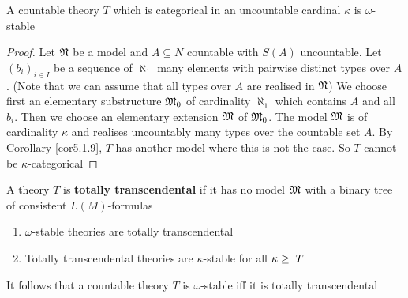 \documentclass[11pt]{article}
\begin{document}
\begin{theorem}[]
\label{thm5.2.4}
A countable theory \(T\) which is categorical in an uncountable cardinal \(\kappa\) is \(\omega\)-stable
\end{theorem}

\begin{proof}
Let \(\mathfrak{N}\) be a model and \(A\subseteq N\) countable with \(S(A)\) uncountable. Let \((b_i)_{i\in I}\) be a
sequence of \(\aleph_1\) many elements with pairwise distinct types over \(A\). (Note that we can
assume that all types over \(A\) are realised in \(\mathfrak{N}\)) We choose first an elementary
substructure \(\mathfrak{M}_0\) of cardinality \(\aleph_1\) which contains \(A\) and all \(b_i\). Then we choose an
elementary extension \(\mathfrak{M}\) of \(\mathfrak{M}_0\). The model \(\mathfrak{M}\) is of cardinality \(\kappa\) and realises
uncountably many types over the countable set \(A\). By Corollary \ref{cor5.1.9}, \(T\) has another
model where this is not the case. So \(T\) cannot be \(\kappa\)-categorical
\end{proof}

\begin{definition}[]
A theory \(T\) is \textbf{totally transcendental} if it has no model \(\mathfrak{M}\) with a binary tree of
consistent \(L(M)\)-formulas
\end{definition}

\begin{theorem}[]
\label{thm5.2.6}
\begin{enumerate}
\item \(\omega\)-stable theories are totally transcendental
\item Totally transcendental theories are \(\kappa\)-stable for all \(\kappa\ge\abs{T}\)
\end{enumerate}
\end{theorem}

It follows that a countable theory \(T\) is \(\omega\)-stable iff it is totally transcendental
\end{document}

